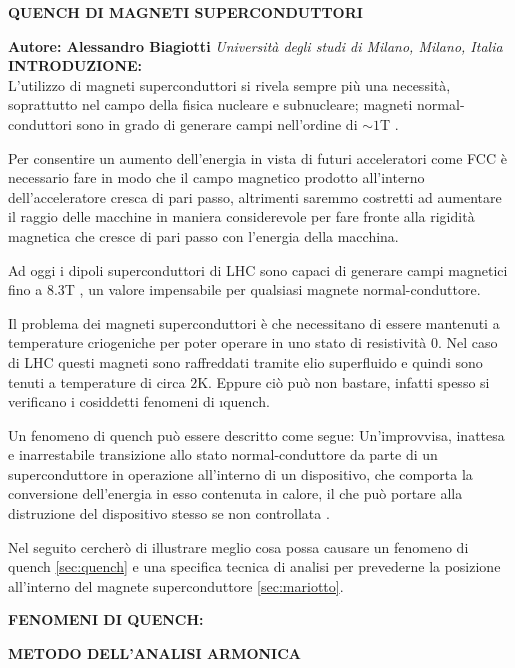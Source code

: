 \documentclass[a4paper,10pt]{article}
\begin{document}
\noindent
\begin{center}
	\textbf{{\Large QUENCH DI MAGNETI SUPERCONDUTTORI}} \\
\end{center}

\noindent
\textbf{Autore: Alessandro Biagiotti} \hfill \textit{Università degli studi di Milano, Milano, Italia}
\\

\noindent
{}
\makeatletter\def\@currentlabel{\texttt{(I)}}\makeatother
\label{sec:intro}
\textbf{INTRODUZIONE:}
\\
L'utilizzo di magneti superconduttori si rivela sempre più una necessità, soprattutto nel campo
della fisica nucleare e subnucleare; magneti normal-conduttori sono in grado di generare campi
nell'ordine di $\sim 1$T \cite{magnets}.

Per consentire un aumento dell'energia in vista di futuri acceleratori come FCC è necessario fare in
modo che il campo magnetico prodotto all'interno dell'acceleratore cresca di pari passo, altrimenti
saremmo costretti ad aumentare il raggio delle macchine in maniera considerevole per fare fronte
alla rigidità magnetica che cresce di pari passo con l'energia della macchina.

Ad oggi i dipoli superconduttori di LHC sono capaci di generare campi magnetici fino a $8.3$T
\cite{lhc-field}, un valore impensabile per qualsiasi magnete normal-conduttore.

Il problema dei magneti superconduttori è che necessitano di essere mantenuti a temperature
criogeniche per poter operare in uno stato di resistività $0$. Nel caso di LHC questi magneti sono
raffreddati tramite elio superfluido e quindi sono tenuti a temperature di circa $2$K. Eppure ciò
può non bastare, infatti spesso si verificano i cosiddetti fenomeni di \i{quench}.

Un fenomeno di quench può essere descritto come segue: Un'improvvisa, inattesa e inarrestabile
transizione allo stato normal-conduttore da parte di un superconduttore in operazione all'interno di
un dispositivo, che comporta la conversione dell'energia in esso contenuta in calore, il che può
portare alla distruzione del dispositivo stesso se non controllata \cite{quench-pres}.

Nel seguito cercherò di illustrare meglio cosa possa causare un fenomeno di quench
\ref{sec:quench} e una specifica tecnica di analisi per prevederne la posizione all'interno del
magnete superconduttore \ref{sec:mariotto}.

\bigskip
{}
\makeatletter\def\@currentlabel{\texttt{(II)}}\makeatother
\label{sec:quench}
\noindent
\textbf{FENOMENI DI QUENCH:}

\bigskip
{}
\makeatletter\def\@currentlabel{\texttt{(III)}}\makeatother
\label{sec:mariotto}
\noindent
\textbf{METODO DELL'ANALISI ARMONICA}

\clearpage


\end{document}
